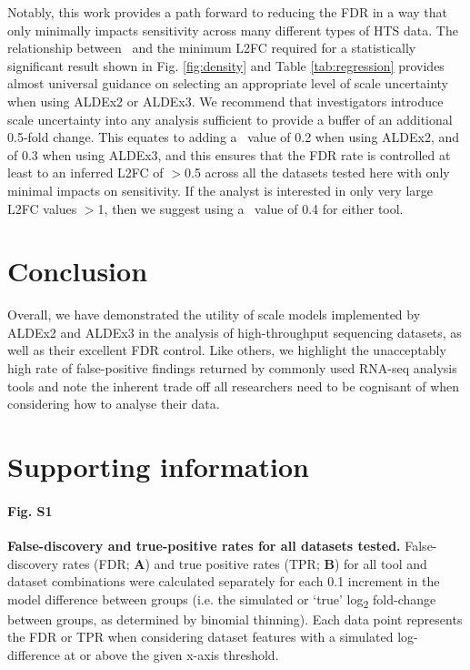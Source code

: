\documentclass[10pt,letterpaper]{article}
\begin{document}
Notably, this work provides a path forward to reducing the FDR in a way that only minimally impacts sensitivity across many different types of HTS data. The relationship between \textgamma~and the minimum L2FC required for a statistically significant result shown in Fig. \ref{fig:density} and Table \ref{tab:regression} provides almost universal guidance on selecting an appropriate level of scale uncertainty when using ALDEx2 or ALDEx3. We recommend that investigators introduce scale uncertainty into any analysis sufficient to provide a buffer of an additional 0.5-fold change. This equates to adding a \textgamma~value of 0.2 when using ALDEx2, and of 0.3 when using ALDEx3, and this ensures that the FDR rate is controlled at least to an inferred L2FC of $>$0.5 across all the datasets tested here with only minimal impacts on sensitivity. If the analyst is interested in only very large L2FC values $>$1, then we suggest using a \textgamma~value of 0.4 for either tool. 

\section*{Conclusion}
Overall, we have demonstrated the utility of scale models implemented by ALDEx2 and ALDEx3 in the analysis of high-throughput sequencing datasets, as well as their excellent FDR control. Like others, we highlight the unacceptably high rate of false-positive findings returned by commonly used RNA-seq analysis tools and note the inherent trade off all researchers need to be cognisant of when considering how to analyse their data.



\section*{Supporting information}

\paragraph*{Fig. S1}
\label{fig:supFigFDR_TPR_all}
\textbf{False-discovery and true-positive rates for all datasets tested.} False-discovery rates (FDR; \textbf{A}) and true positive rates (TPR; \textbf{B}) for all tool and dataset combinations were calculated separately for each 0.1 increment in the model difference between groups (i.e. the simulated or `true' log\textsubscript{2} fold-change between groups, as determined by binomial thinning). Each data point represents the FDR or TPR when considering dataset features with a simulated log-difference at or above the given x-axis threshold.
\end{document}
